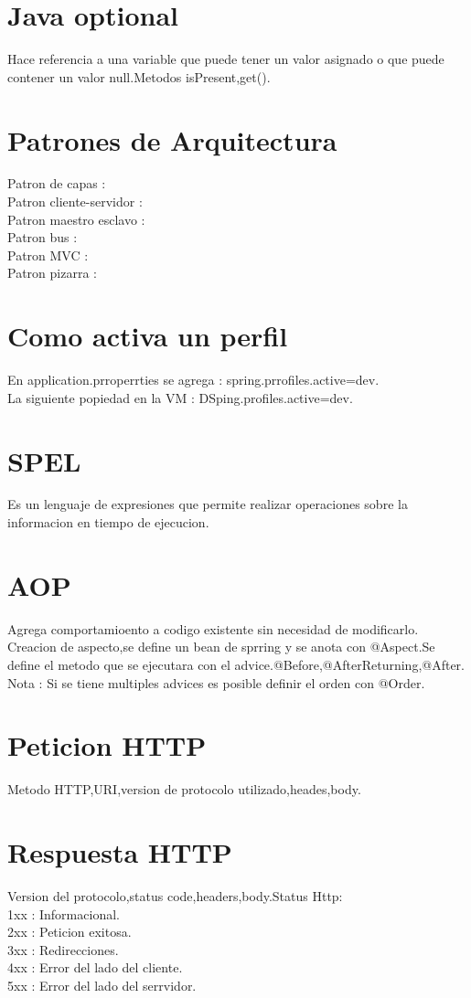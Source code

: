 \section{Java optional}
Hace referencia a una variable  que puede tener un valor asignado o que puede contener un valor
 null.Metodos isPresent,get().
\section{Patrones de Arquitectura}
Patron de capas : \\
Patron cliente-servidor : \\
Patron maestro esclavo : \\
Patron bus : \\
Patron MVC : \\
Patron pizarra : 
\section{Como activa un perfil}
En application.prroperrties se agrega : spring.prrofiles.active=dev.\\
La siguiente popiedad en la VM : DSping.profiles.active=dev.
\section{SPEL}
Es un lenguaje de expresiones que permite realizar operaciones sobre la informacion en
tiempo de ejecucion.
\section{AOP}
Agrega comportamioento a codigo existente sin necesidad de modificarlo.\\
Creacion de aspecto,se define un bean de sprring y se anota con @Aspect.Se define
el metodo que se ejecutara con el advice.@Before,@AfterReturning,@After.\\
Nota : Si se tiene multiples advices es posible definir el orden con @Order.
\section{Peticion HTTP}
Metodo HTTP,URI,version de protocolo utilizado,heades,body.
\section{Respuesta HTTP}
Version del protocolo,status code,headers,body.Status Http:\\
1xx : Informacional.\\
2xx : Peticion exitosa.\\
3xx : Redirecciones.\\
4xx : Error del lado del cliente.\\
5xx : Error del lado del serrvidor. 
